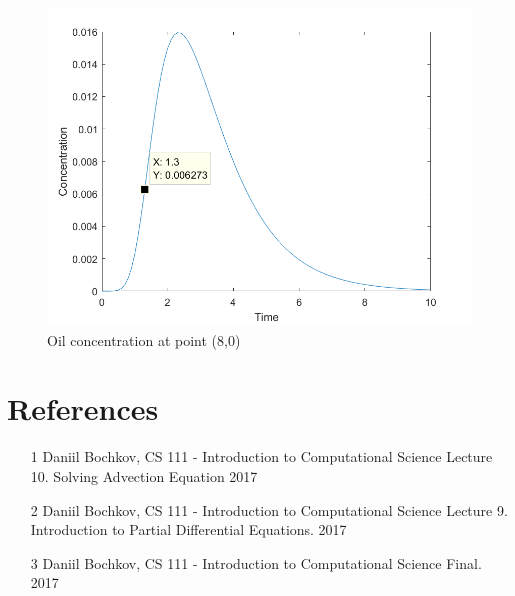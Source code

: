 \documentclass[12pt]{article}
\begin{document}
\begin{figure}[bht]
\begin{center}
\includegraphics[width=1\textwidth]{concentration8}
\end{center}
\caption{Oil concentration at point (8,0)} \label{fig::MyFigure}
\end{figure}



\newpage
\clearpage
\setcounter{page}{1} \pagestyle{empty}
\section{References}\label{sec::References}
\begin{itemize}
\item [1] Daniil Bochkov, CS 111 - Introduction to Computational Science Lecture 10. Solving Advection Equation 2017
\item [2] Daniil Bochkov, CS 111 - Introduction to Computational Science Lecture 9. Introduction to Partial Differential Equations. 2017
\item [3] Daniil Bochkov, CS 111 - Introduction to Computational Science Final.  2017

\end{itemize}


\end{document}
